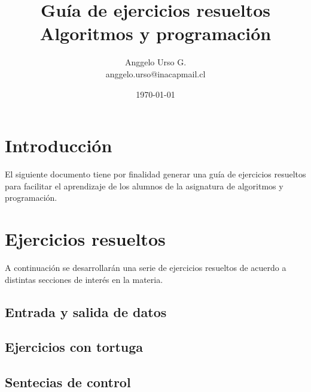 \documentclass[]{article}
\title{Guía de ejercicios resueltos \protect\\ Algoritmos y programación}
\author{Anggelo Urso G. \\ anggelo.urso@inacapmail.cl}
\date{\today}
\begin{document}
    \thispagestyle{empty}
    \maketitle

    \section{Introducción}
    
    El siguiente documento tiene por finalidad generar una guía de ejercicios resueltos para facilitar el aprendizaje de los alumnos de la asignatura de algoritmos y programación.

    \section{Ejercicios resueltos}

    A continuación se desarrollarán una serie de ejercicios resueltos de acuerdo a distintas secciones de interés en la materia.

    \subsection{Entrada y salida de datos}
    

    \subsection{Ejercicios con tortuga}
    

    \subsection{Sentecias de control}
    
\end{document}
